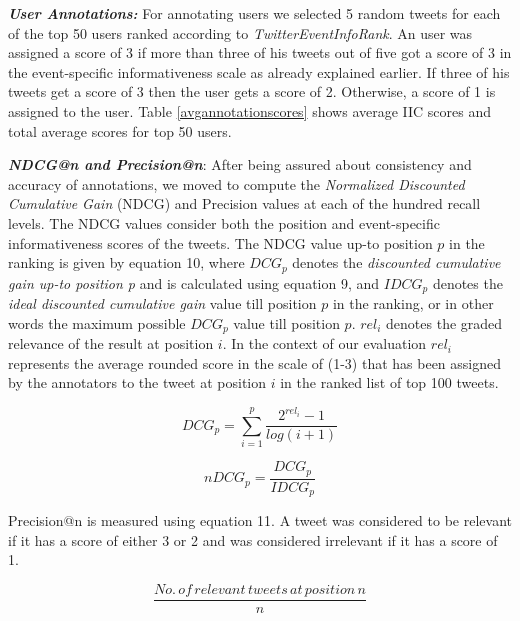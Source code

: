 \noindent \textit{\textbf{User Annotations:}} For annotating users we selected 5 random tweets for each of the top 50 users ranked according to \textit{TwitterEventInfoRank}. An user was assigned a score of 3 if more than three of his tweets out of five got a score of 3 in the event-specific informativeness scale as already explained earlier. If three of his tweets get a score of 3 then the user gets a score of 2. Otherwise, a score of 1 is assigned to the user. Table \ref{avgannotationscores} shows average IIC scores and total average scores for top 50 users.

 
\noindent \textit{\textbf{NDCG@n and Precision@n}}: After being assured about consistency and accuracy of annotations, we moved to compute the \textit{Normalized Discounted Cumulative Gain} (NDCG) \cite{jarvelin2002cumulated} and Precision \cite{baeza1999modern} values at each of the hundred recall levels. The NDCG values consider both the position and event-specific informativeness scores of the tweets. The NDCG value up-to position $\scriptstyle p$ in the ranking is given by equation 10, where $\scriptstyle DCG_{p}$ denotes the \textit{discounted cumulative gain up-to position p} and is calculated using equation 9, and $\scriptstyle IDCG_{p}$ denotes the \textit{ideal discounted cumulative gain} value till position $\scriptstyle p$ in the ranking, or in other words the maximum possible $\scriptstyle DCG_{p}$ value till position $\scriptstyle p$. $\scriptstyle rel_{i}$ denotes the graded relevance of the result at position $\scriptstyle i$. In the context of our evaluation $\scriptstyle rel_{i}$ represents the average rounded score in the scale of (1-3) that has been assigned by the annotators to the tweet at position  $\scriptstyle i$ in the ranked list of top 100 tweets.

\begin{equation}
\scriptstyle
DCG_{p} = \sum_{i=1}^{p}\frac{2^{rel_{i}}-1}{log(i+1)}
\end{equation}

\begin{equation}
\scriptstyle
nDCG_{p} = \frac{DCG_{p}}{IDCG_{p}} 
\end{equation}

Precision@n is measured using equation 11. A tweet was considered to be relevant if it has a score of either 3 or 2 and was considered irrelevant if it has a score of 1.

\begin{equation}
\scriptstyle
\frac{No.\,of\, relevant\, tweets\, at\, position\, n}{n}
\end{equation}




